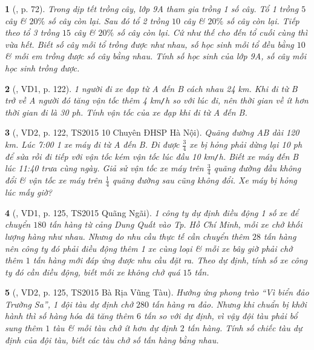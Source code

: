 \documentclass{article}
\newtheorem{baitoan}{}
\begin{document}
\begin{baitoan}[\cite{Binh_boi_duong_Toan_9_tap_2}, p. 72]
	Trong dịp tết trồng cây, lớp 9A tham gia trồng 1 số cây. Tổ 1 trồng $5$ cây \& $20\%$ số cây còn lại. Sau đó tổ 2 trồng $10$ cây \& $20\%$ số cây còn lại. Tiếp theo tổ 3 trồng $15$ cây \& $20\%$ số cây còn lại. Cứ như thế cho đến tổ cuối cùng thì vừa hết. Biết số cây mỗi tổ trồng được như nhau, số học sinh mỗi tổ đều bằng $10$ \& mỗi em trồng được số cây bằng nhau. Tính số học sinh của lớp 9A, số cây mỗi học sinh trồng được.
\end{baitoan}

\begin{baitoan}[\cite{Kien_dai_so_9}, VD1, p. 122]
	1 người đi xe đạp từ A đến B cách nhau {\rm24 km}. Khi đi từ B trở về A người đó tăng vận tốc thêm {\rm4 km{\tt/}h} so với lúc đi, nên thời gian về ít hơn thời gian đi là {\rm30 ph}. Tính vận tốc của xe đạp khi đi từ A đến B.
\end{baitoan}

\begin{baitoan}[\cite{Kien_dai_so_9}, VD2, p. 122, TS2015 10 Chuyên ĐHSP Hà Nội]
	Quãng đường AB dài {\rm120 km}. Lúc {\rm7:00} 1 xe máy đi từ A đến B. Đi được $\frac{3}{4}$ xe bị hỏng phải dừng lại {\rm10 ph} để sửa rồi đi tiếp với vận tốc kém vận tốc lúc đầu {\rm10 km{\tt/}h}. Biết xe máy đến B lúc {\rm11:40} trưa cùng ngày. Giả sử vận tốc xe máy trên $\frac{3}{4}$ quãng đường đầu không đổi \& vận tốc xe máy trên $\frac{1}{4}$ quãng đường sau cũng không đổi. Xe máy bị hỏng lúc mấy giờ?
\end{baitoan}

\begin{baitoan}[\cite{Kien_dai_so_9}, VD1, p. 125, TS2015 Quãng Ngãi]
	1 công ty dự định điều động 1 số xe để chuyển $180$ tấn hàng từ cảng Dung Quất vào Tp. Hồ Chí Minh, mỗi xe chở khối lượng hàng như nhau. Nhưng do nhu cầu thực tế cần chuyển thêm $28$ tấn hàng nên công ty đó phải điều động thêm 1 xe cùng loại \& mỗi xe bây giờ phải chở thêm $1$ tấn hàng mới đáp ứng được nhu cầu đặt ra. Theo dự định, tính số xe công ty đó cần điều động, biết mỗi xe không chở quá $15$ tấn.
\end{baitoan}

\begin{baitoan}[\cite{Kien_dai_so_9}, VD2, p. 125, TS2015 Bà Rịa Vũng Tàu]
	Hưởng ứng phong trào ``Vì biển đảo Trường Sa'', 1 đội tàu dự định chở $280$ tấn hàng ra đảo. Nhưng khi chuẩn bị khởi hành thì số hàng hóa đã tăng thêm $6$ tấn so với dự định, vì vậy đội tàu phải bổ sung thêm $1$ tàu \& mỗi tàu chở ít hơn dự định $2$ tấn hàng. Tính số chiếc tàu dự định của đội tàu, biết các tàu chở số tấn hàng bằng nhau.
\end{baitoan}
\end{document}
